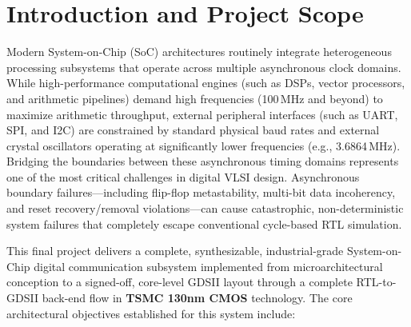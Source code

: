 \documentclass[11pt,a4paper]{article}
\begin{document}
\vspace{0.8cm}

\section{Introduction and Project Scope}

Modern System-on-Chip (SoC) architectures routinely integrate heterogeneous processing subsystems that operate across multiple asynchronous clock domains. While high-performance computational engines (such as DSPs, vector processors, and arithmetic pipelines) demand high frequencies (100\,MHz and beyond) to maximize arithmetic throughput, external peripheral interfaces (such as UART, SPI, and I2C) are constrained by standard physical baud rates and external crystal oscillators operating at significantly lower frequencies (e.g., 3.6864\,MHz). Bridging the boundaries between these asynchronous timing domains represents one of the most critical challenges in digital VLSI design. Asynchronous boundary failures---including flip-flop metastability, multi-bit data incoherency, and reset recovery/removal violations---can cause catastrophic, non-deterministic system failures that completely escape conventional cycle-based RTL simulation.

This final project delivers a complete, synthesizable, industrial-grade System-on-Chip digital communication subsystem implemented from microarchitectural conception to a signed-off, core-level GDSII layout through a complete RTL-to-GDSII back-end flow in \textbf{TSMC 130nm CMOS} technology. The core architectural objectives established for this system include:
\end{document}
